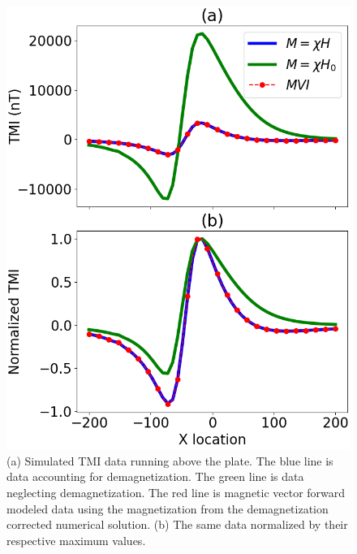 \begin{figure}[htb]
    \vspace{-0.1cm}
    \begin{center}
    \includegraphics[width=\columnwidth]{figures/TMI.png}
    \end{center}
    \vspace{-0.5cm}
\caption{
    (a) Simulated TMI data running above the plate. The blue line is data accounting for demagnetization. The green line is data neglecting demagnetization. The red line is magnetic vector forward modeled data using the magnetization from the demagnetization corrected numerical solution.
    (b) The same data normalized by their respective maximum values.
}
\label{fig:TMI}
\vspace{-0.1cm}
\end{figure}
